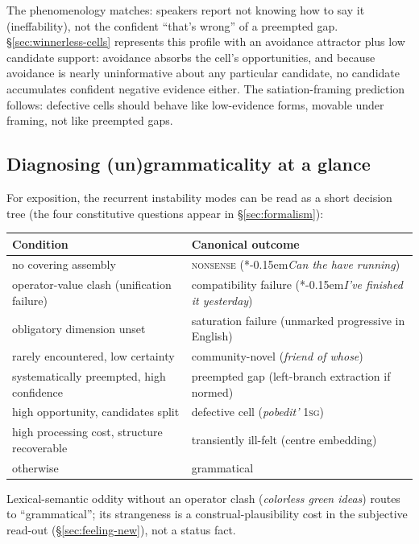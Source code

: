 \documentclass[12pt,letterpaper]{article}
\newcommand{\term}[1]{\textsc{#1}}
\newcommand{\mention}[1]{\textit{#1}}
\newcommand{\abbr}[1]{\textsc{#1}}
\newcommand{\judgesep}{\kern-0.15em}
\newcommand{\ungram}[1]{*\judgesep#1}
\begin{document}
The phenomenology matches: speakers report not knowing how to say it
(ineffability), not the confident \enquote{that's wrong} of a preempted gap.
\S\ref{sec:winnerless-cells} represents this profile with an avoidance
attractor plus low candidate support: avoidance absorbs the cell's opportunities,
and because avoidance is nearly uninformative about any particular candidate, no
candidate accumulates confident negative evidence either. The satiation-framing
prediction follows: defective cells should behave like low-evidence forms,
movable under framing, not like preempted gaps.

\subsection{Diagnosing (un)grammaticality at a glance}
\label{sec:diag-tree}

For exposition, the recurrent instability modes can be read as a short decision
tree (the four constitutive questions appear in \S\ref{sec:formalism}):

\begin{center}
\small
\begin{tabular}{@{}p{}p{}@{}}
\toprule
Condition & Canonical outcome\\
\midrule
no covering assembly &
\term{nonsense} (\ungram{\mention{Can the have running}})\\[4pt]
operator-value clash (unification failure) &
compatibility failure (\ungram{\mention{I've finished it yesterday}})\\[4pt]
obligatory dimension unset &
saturation failure (unmarked progressive in English)\\[4pt]
rarely encountered, low certainty &
community-novel (\mention{friend of whose})\\[4pt]
systematically preempted, high confidence &
preempted gap (left-branch extraction if normed)\\[4pt]
high opportunity, candidates split &
defective cell (\mention{pobedit'} \abbr{1sg})\\[4pt]
high processing cost, structure recoverable &
transiently ill-felt (centre embedding)\\[4pt]
otherwise &
grammatical\\
\bottomrule
\end{tabular}
\end{center}

Lexical-semantic oddity without an operator clash (\mention{colorless green
ideas}) routes to \enquote{grammatical}; its strangeness is a
construal-plausibility cost in the subjective read-out
(\S\ref{sec:feeling-new}), not a status fact.
\end{document}
